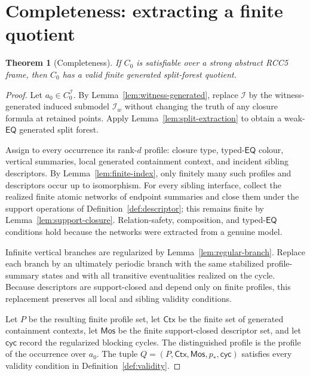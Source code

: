 \documentclass[11pt]{article}
\newtheorem{theorem}[definition]{Theorem}
\theoremstyle{remark}
\newcommand{\EQ}{\mathsf{EQ}}
\newcommand{\Ctx}{\mathsf{Ctx}}
\newcommand{\Mos}{\mathsf{Mos}}
\newcommand{\I}{\mathcal{I}}
\begin{document}
\section{Completeness: extracting a finite quotient}
\begin{theorem}[Completeness]\label{thm:completeness}
If $C_0$ is satisfiable over a strong abstract RCC5 frame, then $C_0$ has a valid finite generated split-forest quotient.
\end{theorem}
\begin{proof}
Let $a_0\in C_0^\I$.  By Lemma~\ref{lem:witness-generated}, replace $\I$ by the witness-generated induced submodel $\I_w$ without changing the truth of any closure formula at retained points.  Apply Lemma~\ref{lem:split-extraction} to obtain a weak-$\EQ$ generated split forest.

Assign to every occurrence its rank-$d$ profile: closure type, typed-$\EQ$ colour, vertical summaries, local generated containment context, and incident sibling descriptors.  By Lemma~\ref{lem:finite-index}, only finitely many such profiles and descriptors occur up to isomorphism.  For every sibling interface, collect the realized finite atomic networks of endpoint summaries and close them under the support operations of Definition~\ref{def:descriptor}; this remains finite by Lemma~\ref{lem:support-closure}.  Relation-safety, composition, and typed-$\EQ$ conditions hold because the networks were extracted from a genuine model.

Infinite vertical branches are regularized by Lemma~\ref{lem:regular-branch}.  Replace each branch by an ultimately periodic branch with the same stabilized profile-summary states and with all transitive eventualities realized on the cycle.  Because descriptors are support-closed and depend only on finite profiles, this replacement preserves all local and sibling validity conditions.

Let $P$ be the resulting finite profile set, let $\Ctx$ be the finite set of generated containment contexts, let $\Mos$ be the finite support-closed descriptor set, and let $\mathsf{cyc}$ record the regularized blocking cycles.  The distinguished profile is the profile of the occurrence over $a_0$.  The tuple $Q=(P,\Ctx,\Mos,p_*,\mathsf{cyc})$ satisfies every validity condition in Definition~\ref{def:validity}.
\end{proof}
\end{document}
